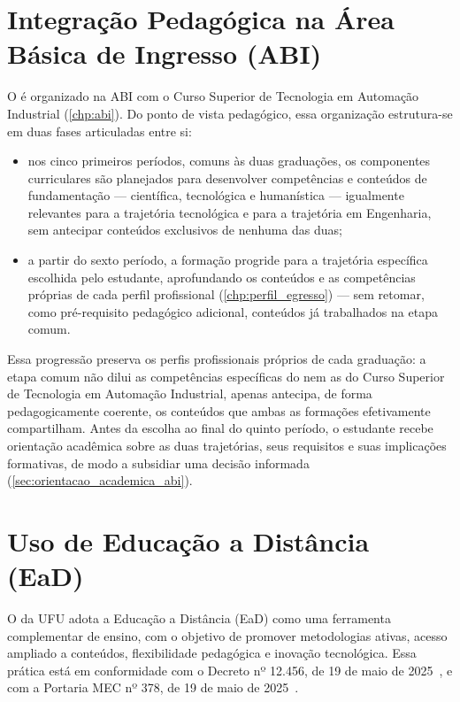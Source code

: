 \section{Integração Pedagógica na Área Básica de Ingresso (ABI)}
\label{sec:integracao_pedagogica_abi}

O \ppccurso é organizado na ABI com o Curso Superior de Tecnologia em Automação Industrial (\autoref{chp:abi}). Do ponto de vista pedagógico, essa organização estrutura-se em duas fases articuladas entre si:

\begin{itemize}
    \item nos cinco primeiros períodos, comuns às duas graduações, os componentes curriculares são planejados para desenvolver competências e conteúdos de fundamentação — científica, tecnológica e humanística — igualmente relevantes para a trajetória tecnológica e para a trajetória em Engenharia, sem antecipar conteúdos exclusivos de nenhuma das duas;
    \item a partir do sexto período, a formação progride para a trajetória específica escolhida pelo estudante, aprofundando os conteúdos e as competências próprias de cada perfil profissional (\autoref{chp:perfil_egresso}) — sem retomar, como pré-requisito pedagógico adicional, conteúdos já trabalhados na etapa comum.
\end{itemize}

Essa progressão preserva os perfis profissionais próprios de cada graduação: a etapa comum não dilui as competências específicas do \ppccurso nem as do Curso Superior de Tecnologia em Automação Industrial, apenas antecipa, de forma pedagogicamente coerente, os conteúdos que ambas as formações efetivamente compartilham. Antes da escolha ao final do quinto período, o estudante recebe orientação acadêmica sobre as duas trajetórias, seus requisitos e suas implicações formativas, de modo a subsidiar uma decisão informada (\autoref{sec:orientacao_academica_abi}).

\section{Uso de Educação a Distância (EaD)}
\label{sec:ead}

O \ppccurso da UFU adota a Educação a Distância (EaD) como uma ferramenta complementar de ensino, com o objetivo de promover metodologias ativas, acesso ampliado a conteúdos, flexibilidade pedagógica e inovação tecnológica. Essa prática está em conformidade com o Decreto nº 12.456, de 19 de maio de 2025~\cite{mec_decreto_ead_12456_2025}, e com a Portaria MEC nº 378, de 19 de maio de 2025~\cite{mec_portaria_378_2025}.

